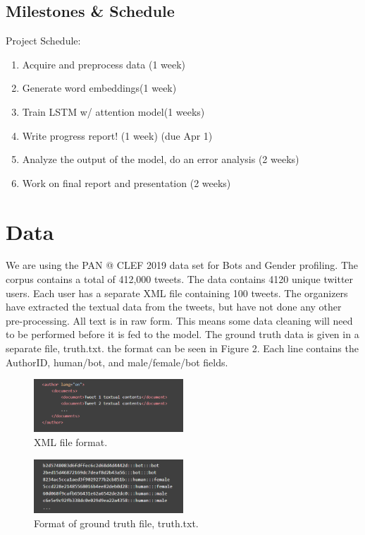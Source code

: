 \documentclass[11pt,a4paper]{article}
\begin{document}
\subsection{Milestones \& Schedule}
 Project Schedule:
\begin{enumerate}
    \item Acquire and preprocess data (1 week)
    \item Generate word embeddings(1 week)
    \item Train LSTM w/ attention model(1 weeks)
    \item Write progress report! (1 week) (due Apr 1)
    \item Analyze the output of the model, do an error analysis (2 weeks)
    \item Work on final report and presentation (2 weeks)
\end{enumerate}


\section{Data}
We are using the PAN @ CLEF 2019 data set for Bots and Gender profiling. The corpus contains a total of 412,000 tweets. The data contains 4120 unique twitter users. Each user has a separate XML file containing 100 tweets.
The organizers have extracted the textual data from the tweets, but have not done any other pre-processing. All text is in raw form. This means some data cleaning will need to be performed before it is fed to the model. 
The ground truth data is given in a separate file, truth.txt. the format can be seen in Figure 2. Each line contains the AuthorID, human/bot, and male/female/bot fields.



\begin{figure}[t]
    \centering
    \includegraphics[width=0.5\textwidth]{figs/xml.png}
    \caption{XML file format.}
    \label{fig:data_example}
\end{figure}

\begin{figure}[t]
    \centering
    \includegraphics[width=0.5\textwidth]{figs/truth.PNG}
    \caption{Format of ground truth file, truth.txt.}
    \label{fig:data_example}
\end{figure}
\end{document}

